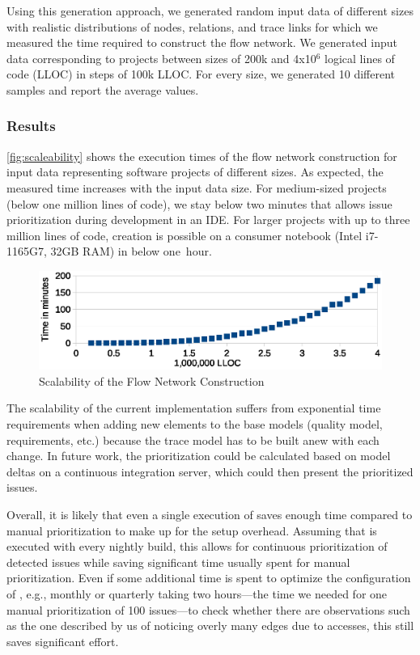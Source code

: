 Using this generation approach, we generated random input data of different sizes with realistic distributions of nodes, relations, and trace links for which we measured the time required to construct the flow network.
We generated input data corresponding to projects between sizes of
200k and 4x10$^6$
logical lines of code (LLOC) in steps of 100k %
LLOC. For every size, we generated 10 different samples and report the average values.

\subsubsection{Results}
%
\autoref{fig:scaleability} shows the execution times of the flow network construction for input data representing software projects of different sizes.
As expected, the measured time increases with the input data size.
For medium-sized projects (below one million lines of code), we stay below two minutes that allows issue prioritization during development in an IDE.
For larger projects with up to three million lines of code, creation is possible on a consumer notebook (Intel i7-1165G7, 32GB RAM) in below one~hour.

\begin{figure}
    \centering
    \includegraphics[width=.65\columnwidth]{figures/tracesec-scalability.eps}
    \caption{Scalability of the Flow Network Construction}
    \label{fig:scaleability}
\end{figure}

The scalability of the current implementation suffers from exponential time requirements when adding new elements to the base models (quality model, requirements, etc.) because the trace model has to be built anew with each change.
In future work, the prioritization could be calculated based on model deltas on a continuous integration server, which could then present the prioritized issues.

	Overall, it is likely that even a single execution of \appr{} saves enough time compared to manual prioritization to make up for the setup overhead.
	Assuming that \appr{} is executed with every nightly build, this allows for continuous prioritization of detected issues while saving significant time usually spent for manual prioritization.
	Even if some additional time is spent to optimize the configuration of \appr{}, e.g., monthly or quarterly taking two hours---the time we needed for one manual prioritization of 100 issues---to check whether there are observations such as the one described by us of noticing overly many edges due to accesses, this still saves significant effort.
